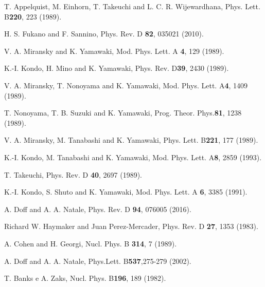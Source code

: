 \documentclass[preprint,amsmath,amssymb,superscriptaddress,showpacs,aps12pt]{revtex4}
\begin{document}
\begin{thebibliography}{00}
 T. Appelquist, M. Einhorn, T. Takeuchi and L. C. R. Wijewardhana, Phys. Lett. B{\bf 220}, 223 (1989).

 H. S. Fukano and F. Sannino, Phys. Rev. D {\bf 82}, 035021 (2010).

 V. A. Miransky and K. Yamawaki, Mod. Phys. Lett. A {\bf 4}, 129 (1989).

 K.-I. Kondo, H. Mino and K. Yamawaki, Phys. Rev. D{\bf 39}, 2430 (1989).

 V. A. Miransky, T. Nonoyama and K. Yamawaki, Mod. Phys. Lett. A{\bf 4}, 1409 (1989).

 T. Nonoyama, T. B. Suzuki and K. Yamawaki, Prog. Theor. Phys.{\bf 81}, 1238 (1989).

 V. A. Miransky, M. Tanabashi and K. Yamawaki, Phys. Lett. B{\bf 221}, 177 (1989).

 K.-I. Kondo, M. Tanabashi and K. Yamawaki, Mod. Phys. Lett. A{\bf 8}, 2859 (1993).

 T. Takeuchi, Phys. Rev. D {\bf 40}, 2697 (1989).

 K.-I. Kondo, S. Shuto and K. Yamawaki, Mod. Phys. Lett. A {\bf 6}, 3385 (1991). 

 A. Doff and A. A. Natale, Phys. Rev. D {\bf 94}, 076005 (2016).

 Richard W. Haymaker and Juan Perez-Mercader, Phys. Rev. D {\bf 27}, 1353 (1983).

 A. Cohen and H. Georgi, Nucl. Phys. B {\bf 314}, 7 (1989). 

 A. Doff and A. A. Natale, Phys.Lett. B{\bf 537},275-279 (2002).

 T. Banks e A. Zaks, Nucl. Phys. B{\bf 196}, 189 (1982).



\end{thebibliography}
\end{document}
